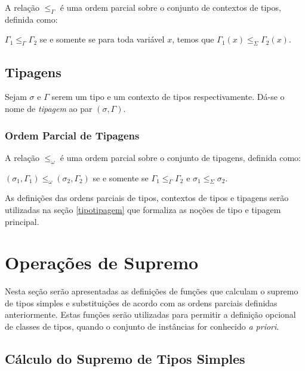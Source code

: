 A rela\c{c}\~ao $\leq_{\Gamma}$ \'e uma ordem parcial sobre o conjunto de contextos de tipos, definida como:
\begin{center}
	$\Gamma_{1}\leq_{\Gamma}\Gamma_{2}$ se e somente se para toda vari\'avel $x$, temos que 
	$\Gamma_{1}(x)\leq_{\Sigma}\Gamma_{2}(x)$.
\end{center}

\subsection{Tipagens}

Sejam $\sigma$ e $\Gamma$ serem um tipo e um contexto de tipos respectivamente. D\'a-se o nome de \emph{tipagem} ao par
$(\sigma,\Gamma)$.

\subsubsection{Ordem Parcial de Tipagens}\label{typingorder}

A rela\c{c}\~ao $\leq_{\omega}$ \'e uma ordem parcial sobre o conjunto de tipagens, definida como:
\begin{center}
	$(\sigma_{1},\Gamma_{1})\leq_{\omega}(\sigma_{2},\Gamma_{2})$ se e somente se $\Gamma_{1}\leq_{\Gamma}\Gamma_{2}$ e
	 $\sigma_{1}\leq_{\Sigma}\sigma_{2}$.
\end{center}

As defini\c{c}\~oes das ordens parciais de tipos, contextos de tipos e tipagens ser\~ao utilizadas na se\c{c}\~ao 
\ref{tipotipagem} que formaliza as no\c{c}\~oes de tipo e tipagem principal.

\section{Opera\c{c}\~oes de Supremo}\label{lcg}

Nesta se\c{c}\~ao ser\~ao apresentadas as defini\c{c}\~oes de fun\c{c}\~oes que calculam o supremo de tipos simples e
substitui\c{c}\~oes de acordo com as ordens parciais definidas anteriormente. Estas fun\c{c}\~oes ser\~ao utilizadas 
para permitir a defini\c{c}\~ao opcional de classes de tipos, quando o conjunto de inst\^ancias for conhecido 
\emph{a priori}.

\subsection{C\'alculo do Supremo de Tipos Simples}

